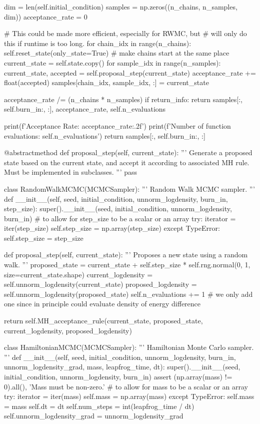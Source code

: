 \documentclass[a4paper, 12pt,oneside]{article}
\begin{document}
\begin{python}
					dim = len(self.initial_condition)
					samples = np.zeros((n_chains, n_samples, dim))
					acceptance_rate = 0
					
					# This could be made more efficient, especially for RWMC, but 
					# will only do this if runtime is too long.
					for chain_idx in range(n_chains):
						self.reset_state(only_state=True) # make chains start at the same place
						current_state = self.state.copy()
						for sample_idx in range(n_samples):
							current_state, accepted = self.proposal_step(current_state)
							acceptance_rate += float(accepted)
							samples[chain_idx, sample_idx, :] = current_state
					
					acceptance_rate /= (n_chains * n_samples)
					if return_info:
						return samples[:, self.burn_in:, :], acceptance_rate, self.n_evaluations

					print(f'Acceptance Rate: {acceptance_rate:.2f}')
					print(f'Number of function evaluations: {self.n_evaluations}')
					return samples[:, self.burn_in:, :]
				
				@abstractmethod
				def proposal_step(self, current_state):
					'''
					Generate a proposed state based on the current state, and accept it according to associated MH rule.
					Must be implemented in subclasses.
					'''
					pass

			class RandomWalkMCMC(MCMCSampler):
				'''
				Random Walk MCMC sampler.
				'''
				def __init__(self, seed, initial_condition, unnorm_logdensity, burn_in, step_size):
					super().__init__(seed, initial_condition, unnorm_logdensity, burn_in)
					# to allow for step_size to be a scalar or an array
					try:
						iterator = iter(step_size)
						self.step_size = np.array(step_size)
					except TypeError:
						self.step_size = step_size
				
				def proposal_step(self, current_state):
					'''
					Proposes a new state using a random walk.
					'''
					proposed_state = current_state + self.step_size * self.rng.normal(0, 1, size=current_state.shape)
					current_logdensity = self.unnorm_logdensity(current_state)
					proposed_logdensity = self.unnorm_logdensity(proposed_state)
					self.n_evaluations += 1 
					# we only add one since in principle could evaluate density of energy difference

					return self.MH_acceptance_rule(current_state, proposed_state, current_logdensity, proposed_logdensity)

			class HamiltonianMCMC(MCMCSampler):
				'''
				Hamiltonian Monte Carlo sampler.
				'''
				def __init__(self, seed, initial_condition, unnorm_logdensity, burn_in, unnorm_logdensity_grad, mass, leapfrog_time, dt):
					super().__init__(seed, initial_condition, unnorm_logdensity, burn_in)
					assert (np.array(mass) != 0).all(), 'Mass must be non-zero.'
					# to allow for mass to be a scalar or an array
					try:
						iterator = iter(mass)
						self.mass = np.array(mass)
					except TypeError:
						self.mass = mass
					self.dt = dt
					self.num_steps = int(leapfrog_time / dt)
					self.unnorm_logdensity_grad = unnorm_logdensity_grad
				

\end{python}
\end{document}
